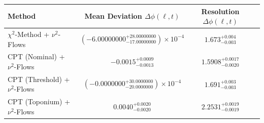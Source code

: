     \begin{tabular}{lccc}
        \toprule
        Method & Mean Deviation $\Delta\phi(\ell, t)$ & Resolution $\Delta\phi(\ell, t)$ \\
        \midrule
        $\chi^2$-Method + $\nu^2$-Flows & $(-6.00000000^{+28.00000000}_{-17.00000000})\times 10^{-4}$ & $1.673^{+0.004}_{-0.003}$ \\
        CPT (Nominal) + $\nu^2$-Flows & $-0.0015^{+0.0009}_{-0.0013}$ & $1.5908^{+0.0017}_{-0.0020}$ \\
        CPT (Threshold) + $\nu^2$-Flows & $(-0.0000000^{+30.0000000}_{-20.0000000})\times 10^{-4}$ & $1.691^{+0.003}_{-0.003}$ \\
        CPT (Toponium) + $\nu^2$-Flows & $0.0040^{+0.0020}_{-0.0020}$ & $2.2531^{+0.0019}_{-0.0019}$ \\
        \bottomrule
    \end{tabular}
